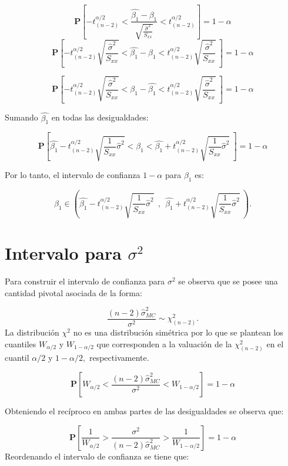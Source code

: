 \documentclass[
  a4paper,
  oneside,
  openany]{book}
\begin{document}
\[\mathbf{P}\left[-t^{\alpha/2}_{(n-2)} < \frac{\hat{\beta_{1}}-\beta_{1}}{\sqrt{\frac{\hat{\sigma}^2}{S_{xx}}}} < t^{\alpha/2}_{(n-2)}\right]=1-\alpha\]
\[\mathbf{P}\left[-t^{\alpha/2}_{(n-2)} \sqrt{\frac{\hat{\sigma}^2}{S_{xx}}} < \hat{\beta_{1}}-\beta_{1}< t^{\alpha/2}_{(n-2)} \sqrt{\frac{\hat{\sigma}^2}{S_{xx}}} \ \right]=1-\alpha\]

\[\mathbf{P}\left[-t^{\alpha/2}_{(n-2)} \sqrt{\frac{\hat{\sigma}^2}{S_{xx}}} < \beta_{1}-\hat{\beta_{1}}< t^{\alpha/2}_{(n-2)} \sqrt{\frac{\hat{\sigma}^2}{S_{xx}}} \ \right]=1-\alpha\]

Sumando \(\hat{\beta_{1}}\) en todas las desigualdades:

\[\mathbf{P}\left[\hat{\beta_{1}}-t^{\alpha/2}_{(n-2)} \sqrt{\frac{1}{S_{xx}}\hat{\sigma}^2} < \beta_{1}< \hat{\beta_{1}}+t^{\alpha/2}_{(n-2)} \sqrt{\frac{1}{S_{xx}}\hat{\sigma}^2} \ \right]=1-\alpha\]

Por lo tanto, el intervalo de confianza \(1-\alpha\) para \(\beta_{1}\) es:

\[\beta_{1} \in \left( \hat{\beta_{1}}-t^{\alpha/2}_{(n-2)} \sqrt{\frac{1}{S_{xx}}\hat{\sigma}^2} \ \ , \ \ \hat{\beta_{1}}+t^{\alpha/2}_{(n-2)} \sqrt{\frac{1}{S_{xx}}\hat{\sigma}^2} \  \right).\]

\hypertarget{intervalo-para-sigma2}{%
\section{\texorpdfstring{Intervalo para \(\sigma^2\)}{Intervalo para \textbackslash sigma\^{}2}}\label{intervalo-para-sigma2}}

Para construir el intervalo de confianza para \(\sigma^2\) se observa que se posee una cantidad pivotal asociada de la forma:

\[\frac{(n-2)\hat{\sigma}^2_{MC}}{\sigma^2}\sim \chi^2_{(n-2)}.\]
La distribución \(\chi^2\) no es una distribución simétrica por lo que se plantean los cuantiles \(W_{\alpha/2}\) y \(W_{1-\alpha/2}\) que corresponden a la valuación de la \(\chi^2_{(n-2)}\) en el cuantil \(\alpha/2\) y \(1-\alpha/2,\) respectivamente.

\[\mathbf{P}\left[W_{\alpha/2}<\frac{(n-2)\hat{\sigma}^2_{MC}}{\sigma^2}< W_{1-\alpha/2}\right]=1-\alpha\]

Obteniendo el recíproco en ambas partes de las desigualdades se observa que:

\[\mathbf{P}\left[\frac{1}{W_{\alpha/2}}>\frac{\sigma^2}{(n-2)\hat{\sigma}^2_{MC}}>\frac{1} {W_{1-\alpha/2}}\right]=1-\alpha\]
Reordenando el intervalo de confianza se tiene que:
\end{document}
